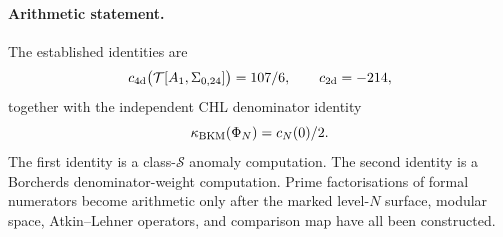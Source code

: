 \paragraph{Arithmetic statement.}
The established identities are
\[
  c_{\mathrm{4d}}\bigl(\mathcal{T}[A_1,\Sigma_{0,24}]\bigr)=107/6,
  \qquad
  c_{\mathrm{2d}}=-214,
\]
together with the independent CHL denominator identity
\[
  \kappa_{\mathrm{BKM}}(\Phi_N)=c_N(0)/2 .
\]
The first identity is a class-\(\mathcal{S}\) anomaly computation. The
second identity is a Borcherds denominator-weight computation. Prime
factorisations of formal numerators become arithmetic only after the
marked level-\(N\) surface, modular space, Atkin--Lehner operators, and
comparison map have all been constructed.
